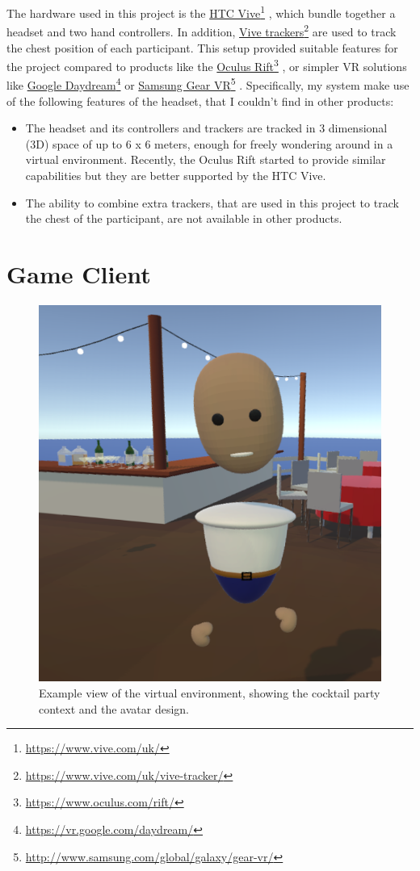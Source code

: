 \documentclass[]{simple-thesis}
\newcommand\fnurl[2]{%
  \href{#2}{#1}\footnote{\url{#2}}%
}
\begin{document}
The hardware used in this project is the \fnurl{HTC Vive}{https://www.vive.com/uk/}, which bundle together a headset and two hand controllers.
In addition, \fnurl{Vive trackers}{https://www.vive.com/uk/vive-tracker/} are used to track the chest position of each participant.
This setup provided suitable features for the project compared to products like the \fnurl{Oculus Rift}{https://www.oculus.com/rift/}, or simpler VR solutions like \fnurl{Google Daydream}{https://vr.google.com/daydream/} or \fnurl{Samsung Gear VR}{http://www.samsung.com/global/galaxy/gear-vr/}.
Specifically, my system make use of the following features of the headset, that I couldn't find in other products:

\begin{itemize}
  \item The headset and its controllers and trackers are tracked in 3 dimensional (3D) space of up to 6 x 6 meters, enough for freely wondering around in a virtual environment. Recently, the Oculus Rift started to provide similar capabilities but they are better supported by the HTC Vive.
  \item The ability to combine extra trackers, that are used in this project to track the chest of the participant, are not available in other products.
\end{itemize}

\section{Game Client}

\begin{figure}
  \centering
  \includegraphics[width=.5\textwidth]{../graphics/environment_demo.png}
  \caption{Example view of the virtual environment, showing the cocktail party context and the avatar design.}
  \label{fig:system:environment_demo}
\end{figure}
\end{document}
